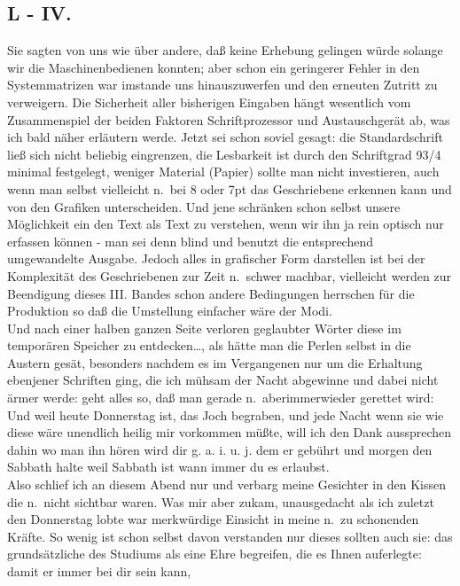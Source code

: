 \documentclass[
]{article}
\author{}
\date{\vspace{-2.5em}}
\begin{document}
\subsection{L - IV.}\label{l---iv.}

Sie sagten von uns wie über andere, daß keine Erhebung gelingen würde
solange wir die Maschinenbedienen konnten; aber schon ein geringerer
Fehler in den Systemmatrizen war imstande uns hinauszuwerfen und den
erneuten Zutritt zu verweigern. Die Sicherheit aller bisherigen Eingaben
hängt wesentlich vom Zusammenspiel der beiden Faktoren Schriftprozessor
und Austauschgerät ab, was ich bald näher erläutern werde. Jetzt sei
schon soviel gesagt: die Standardschrift ließ sich nicht beliebig
eingrenzen, die Lesbarkeit ist durch den Schriftgrad 93/4 minimal
festgelegt, weniger Material (Papier) sollte man nicht investieren, auch
wenn man selbst vielleicht n.~bei 8 oder 7pt das Geschriebene erkennen
kann und von den Grafiken unterscheiden. Und jene schränken schon selbst
unsere Möglichkeit ein den Text als Text zu verstehen, wenn wir ihn ja
rein optisch nur erfassen können - man sei denn blind und benutzt die
entsprechend umgewandelte Ausgabe. Jedoch alles in grafischer Form
darstellen ist bei der Komplexität des Geschriebenen zur Zeit n.~schwer
machbar, vielleicht werden zur Beendigung dieses III. Bandes schon
andere Bedingungen herrschen für die Produktion so daß die Umstellung
einfacher wäre der Modi.\\
Und nach einer halben ganzen Seite verloren geglaubter Wörter diese im
temporären Speicher zu entdecken\ldots, als hätte man die Perlen selbst
in die Austern gesät, besonders nachdem es im Vergangenen nur um die
Erhaltung ebenjener Schriften ging, die ich mühsam der Nacht abgewinne
und dabei nicht ärmer werde: geht alles so, daß man gerade
n.~aberimmerwieder gerettet wird: Und weil heute Donnerstag ist, das
Joch begraben, und jede Nacht wenn sie wie diese wäre unendlich heilig
mir vorkommen müßte, will ich den Dank aussprechen dahin wo man ihn
hören wird dir g. a. i. u. j. dem er gebührt und morgen den Sabbath
halte weil Sabbath ist wann immer du es erlaubst.\\
Also schlief ich an diesem Abend nur und verbarg meine Gesichter in den
Kissen die n.~nicht sichtbar waren. Was mir aber zukam, unausgedacht als
ich zuletzt den Donnerstag lobte war merkwürdige Einsicht in meine n.~zu
schonenden Kräfte. So wenig ist schon selbst davon verstanden nur dieses
sollten auch sie: das grundsätzliche des Studiums als eine Ehre
begreifen, die es Ihnen auferlegte: damit er immer bei dir sein kann,
\end{document}
